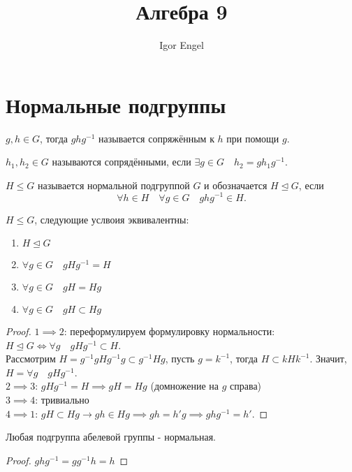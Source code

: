 \documentclass[11pt, oneside]{article}   	%
\title{Алгебра 9}
\author{Igor Engel}
\date{}
\begin{document}
\maketitle
\section{Нормальные подгруппы}
    \begin{definition}
        $g, h\in G$, тогда $ghg^{-1}$ называется сопряжённым к $h$ при помощи $g$.
    \end{definition}
    \begin{definition}
        $h_1, h_2\in G$ называются сопрядёнными, если $\exists{g\in G}\quad h_2 = gh_1g^{-1}$.
    \end{definition}
    \begin{definition}
        $H \le G$ называется нормальной подгруппой $G$ и обозначается $H \unlhd G$, если
        \[ \forall{h\in H}\quad \forall{g\in G}\quad ghg^{-1}\in H  .\] 
    \end{definition}
    \begin{theorem}
        $H \le  G$, следующие услвоия эквивалентны:
        \begin{enumerate}
            \item $H \unlhd G$
            \item  $\forall{g\in G}\quad gHg^{-1} = H$ 
            \item $\forall{g\in G}\quad gH = Hg$ 
            \item $\forall{g\in G}\quad gH \subset Hg$
        \end{enumerate}
        \begin{proof}
            $1 \implies 2$: переформулируем формулировку нормальности: $H \unlhd G \iff \forall{g}\quad gHg^{-1} \subset H$.\\
            Рассмотрим $H = g^{-1}gHg^{-1}g \subset g^{-1}Hg$, пусть $g=k^{-1}$, тогда $H \subset kHk^{-1}$. Значит, $H = \forall{g}\quad gHg^{-1}$.\\
            $2 \implies 3$: $gHg^{-1} = H \implies gH = Hg$ (домножение на $g$ справа)\\
            $3 \implies 4$: тривиально\\
            $4 \implies 1$: $gH \subset Hg \to gh\in Hg \implies gh = h'g \implies ghg^{-1} = h'$.
        \end{proof}
    \end{theorem}
    \begin{tlemma}
        Любая подгруппа абелевой группы - нормальная.\\
        \begin{proof}
            $ghg^{-1} = gg^{-1}h = h$ 
        \end{proof}
    \end{tlemma}
\end{document}
